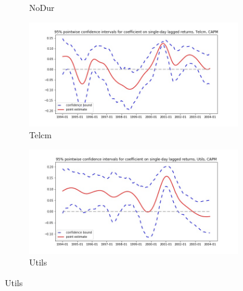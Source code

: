 \documentclass{article}
\begin{document}
\begin{figure}
\begin{subfigure}[b]{0.5\textwidth}
    \caption{NoDur}
    \label{fig:2}
  \end{subfigure}
  \begin{subfigure}[b]{0.5\textwidth}
    \centering
    \includegraphics[width=\textwidth]{Telcm/pointwiseCIs_CAPM.jpg}
    \caption{Telcm}
    \label{fig:2}
  \end{subfigure}
  \begin{subfigure}[b]{0.5\textwidth}
    \centering
    \includegraphics[width=\textwidth]{Utils/pointwiseCIs_CAPM.jpg}
    \caption{Utils}
    \label{fig:2}
  \end{subfigure}
\end{figure}

\newpage
\end{document}
